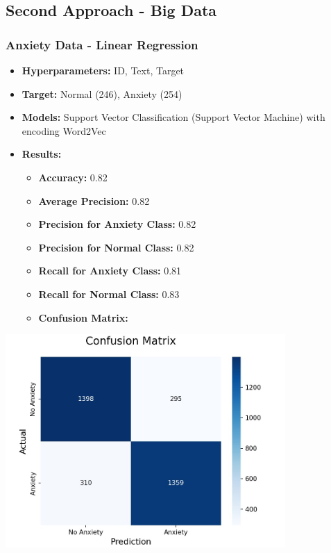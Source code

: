 \documentclass[a4paper,12pt]{article}
\begin{document}
\subsection{Second Approach - Big Data}

\subsubsection{Anxiety Data - Linear Regression}

\begin{itemize}
    \item \textbf{Hyperparameters:} ID, Text, Target
    \item \textbf{Target:} Normal (246), Anxiety (254)
    \item \textbf{Models:} Support Vector Classification (Support Vector Machine) with encoding Word2Vec
    \item \textbf{Results:}
    \begin{itemize}
        \item \textbf{Accuracy:} 0.82
        \item \textbf{Average Precision:} 0.82
        \item \textbf{Precision for Anxiety Class:} 0.82
        \item \textbf{Precision for Normal Class:} 0.82
        \item \textbf{Recall for Anxiety Class:} 0.81
        \item \textbf{Recall for Normal Class:} 0.83
        \item \textbf{Confusion Matrix:}
    \end{itemize}
\end{itemize}

\begin{center}
    \includegraphics[width=0.8\textwidth]{Anxiety-Data-LinearRegression.jpg} %
\end{center}
\end{document}
